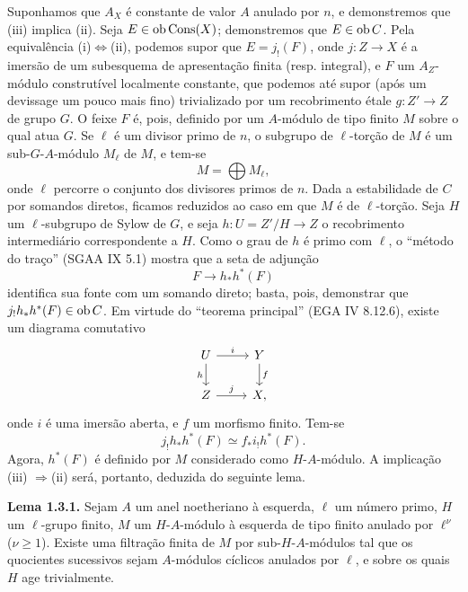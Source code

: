 Suponhamos que $A_X$ é constante de valor $A$ anulado por $n$, e demonstremos que (iii) implica (ii). Seja $E\in\operatorname{ob}\operatorname{Cons}(X)$; demonstremos que $E\in\operatorname{ob} C$. Pela equivalência (i)$\Leftrightarrow$(ii), podemos supor que $E=j_!(F)$, onde $j:Z\to X$ é a imersão de um subesquema de apresentação finita (resp. integral), e $F$ um $A_Z$-módulo construtível localmente constante, que podemos até supor (após um devissage um pouco mais fino) trivializado por um recobrimento étale $g:Z'\to Z$ de grupo $G$. O feixe $F$ é, pois, definido por um $A$-módulo de tipo finito $M$ sobre o qual atua $G$. Se $\ell$ é um divisor primo de $n$, o subgrupo de $\ell$-torção de $M$ é um sub-$G$-$A$-módulo $M_\ell$ de $M$, e tem-se
\[
        M=\bigoplus M_\ell,
\]
onde $\ell$ percorre o conjunto dos divisores primos de $n$. Dada a estabilidade de $C$ por somandos diretos, ficamos reduzidos ao caso em que $M$ é de $\ell$-torção. Seja $H$ um $\ell$-subgrupo de Sylow de $G$, e seja $h:U=Z'/H\to Z$ o recobrimento intermediário correspondente a $H$. Como o grau de $h$ é primo com $\ell$, o ``método do traço'' (SGAA IX 5.1) mostra que a seta de adjunção
\[
        F\longrightarrow h_*h^*(F)
\]
identifica sua fonte com um somando direto; basta, pois, demonstrar que $j_!h_*h^*(F)\in\operatorname{ob} C$. Em virtude do ``teorema principal'' (EGA IV 8.12.6), existe um diagrama comutativo
\[
\begin{tikzcd}
U \arrow[r,"i"] \arrow[d,"h"'] & Y \arrow[d,"f"]\\
Z \arrow[r,"j"] & X,
\end{tikzcd}
\]
onde $i$ é uma imersão aberta, e $f$ um morfismo finito. Tem-se
\[
        j_!h_*h^*(F) \simeq f_* i_! h^*(F).
\]
Agora, $h^*(F)$ é definido por $M$ considerado como $H$-$A$-módulo. A implicação (iii) $\Rightarrow$(ii) será, portanto, deduzida do seguinte lema.

\textbf{Lema 1.3.1.} Sejam $A$ um anel noetheriano à esquerda, $\ell$ um número primo, $H$ um $\ell$-grupo finito, $M$ um $H$-$A$-módulo à esquerda de tipo finito anulado por $\ell^\nu$ ($\nu\geq 1$). Existe uma filtração finita de $M$ por sub-$H$-$A$-módulos tal que os quocientes sucessivos sejam $A$-módulos cíclicos anulados por $\ell$, e sobre os quais $H$ age trivialmente.

